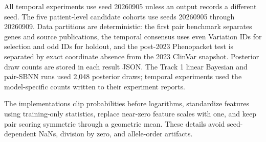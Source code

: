 \documentclass[11pt]{article}
\begin{document}
All temporal experiments use seed 20260905 unless an output records a different seed. The five patient-level candidate cohorts use seeds 20260905 through 20260909. Data partitions are deterministic: the first pair benchmark separates genes and source publications, the temporal consensus uses even Variation IDs for selection and odd IDs for holdout, and the post-2023 Phenopacket test is separated by exact coordinate absence from the 2023 ClinVar snapshot. Posterior draw counts are stored in each result JSON. The Track 1 linear Bayesian and pair-SBNN runs used 2,048 posterior draws; temporal experiments used the model-specific counts written to their experiment reports.

The implementations clip probabilities before logarithms, standardize features using training-only statistics, replace near-zero feature scales with one, and keep pair scoring symmetric through a geometric mean. These details avoid seed-dependent NaNs, division by zero, and allele-order artifacts.
\end{document}
